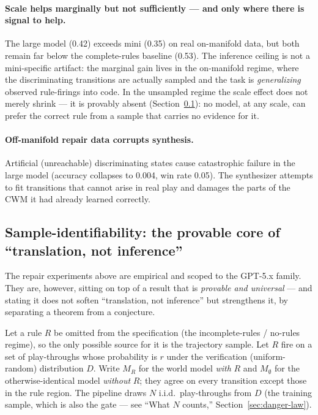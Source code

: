 \documentclass[11pt]{article}
\theoremstyle{remark}
\begin{document}
\paragraph{Scale helps marginally but not sufficiently --- and only where there is signal to help.} The large model (0.42) exceeds mini (0.35) on real on-manifold data, but both remain far below the complete-rules baseline (0.53). The inference ceiling is not a mini-specific artifact: the marginal gain lives in the on-manifold regime, where the discriminating transitions are actually sampled and the task is \emph{generalizing} observed rule-firings into code. In the unsampled regime the scale effect does not merely shrink --- it is provably absent (Section~\ref{sec:sample-identifiability}): no model, at any scale, can prefer the correct rule from a sample that carries no evidence for it.

\paragraph{Off-manifold repair data corrupts synthesis.} Artificial (unreachable) discriminating states cause catastrophic failure in the large model (accuracy collapses to 0.004, win rate 0.05). The synthesizer attempts to fit transitions that cannot arise in real play and damages the parts of the CWM it had already learned correctly.

\subsection{Sample-identifiability: the provable core of ``translation, not inference''}
\label{sec:sample-identifiability}

The repair experiments above are empirical and scoped to the GPT-5.x family. They are, however, sitting on top of a result that is \emph{provable and universal} --- and stating it does not soften ``translation, not inference'' but strengthens it, by separating a theorem from a conjecture.

Let a rule $R$ be omitted from the specification (the incomplete-rules / no-rules regime), so the only possible source for it is the trajectory sample. Let $R$ fire on a set of play-throughs whose probability is $r$ under the verification (uniform-random) distribution $D$. Write $M_R$ for the world model \emph{with} $R$ and $M_\emptyset$ for the otherwise-identical model \emph{without} $R$; they agree on every transition except those in the rule region. The pipeline draws $N$ i.i.d.\ play-throughs from $D$ (the training sample, which is also the gate --- see ``What $N$ counts,'' Section~\ref{sec:danger-law}).
\end{document}
